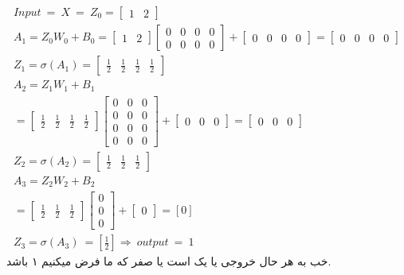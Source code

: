\documentclass{article}[12pt]
\begin{document}
\begin{gather*}
	Input\ =\ X\ =\ Z_{0} =\begin{bmatrix}
		1 & 2
	\end{bmatrix}\\
	A_{1} =Z_{0} W_{0} +B_{0} =\begin{bmatrix}
		1 & 2
	\end{bmatrix}\begin{bmatrix}
		0 & 0 & 0 & 0\\
		0 & 0 & 0 & 0
	\end{bmatrix} +\begin{bmatrix}
		0 & 0 & 0 & 0
	\end{bmatrix} =\begin{bmatrix}
		0 & 0 & 0 & 0
	\end{bmatrix}\\
	Z_{1} =\sigma ( A_{1}) =\begin{bmatrix}
		\frac{1}{2} & \frac{1}{2} & \frac{1}{2} & \frac{1}{2}
	\end{bmatrix}\\
	A_{2} =Z_{1} W_{1} +B_{1}\\
	=\begin{bmatrix}
		\frac{1}{2} & \frac{1}{2} & \frac{1}{2} & \frac{1}{2}
	\end{bmatrix}\begin{bmatrix}
		0 & 0 & 0\\
		0 & 0 & 0\\
		0 & 0 & 0\\
		0 & 0 & 0
	\end{bmatrix} +\begin{bmatrix}
		0 & 0 & 0
	\end{bmatrix} =\begin{bmatrix}
		0 & 0 & 0
	\end{bmatrix}\\
	Z_{2} =\sigma ( A_{2}) =\begin{bmatrix}
		\frac{1}{2} & \frac{1}{2} & \frac{1}{2}
	\end{bmatrix}\\
	A_{3} =Z_{2} W_{2} +B_{2}\\
	=\begin{bmatrix}
		\frac{1}{2} & \frac{1}{2} & \frac{1}{2}
	\end{bmatrix}\begin{bmatrix}
		0\\
		0\\
		0
	\end{bmatrix} +\begin{bmatrix}
		0
	\end{bmatrix} =[ 0]\\
	Z_{3} =\sigma ( A_{3}) \ =\left[\frac{1}{2}\right] \Longrightarrow \ output\ =\ 1
\end{gather*}
خب به هر حال خروجی یا یک است یا صفر که ما فرض میکنیم ۱ باشد. 
\end{document}
